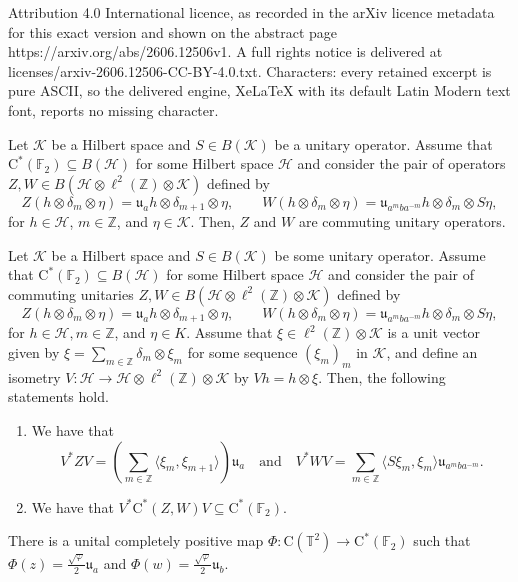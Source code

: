\documentclass[10pt,a4paper]{amsart}
\newcommand{\K}{{\mathcal{K}}}
\newcommand{\bF}{{\mathbb{F}}}
\newcommand{\bT}{{\mathbb{T}}}
\newcommand{\bZ}{{\mathbb{Z}}}
\newcommand{\rC}{\mathrm{C}}
\renewcommand{\H}{{\mathcal{H}}}
\renewcommand{\phi}{\varphi}
\begin{document}
Attribution 4.0 International licence, as recorded in the arXiv licence metadata for this exact version and shown on the abstract page https://arxiv.org/abs/2606.12506v1. A full rights notice is delivered at licenses/arxiv-2606.12506-CC-BY-4.0.txt. Characters: every retained excerpt is pure ASCII, so the delivered engine, XeLaTeX with its default Latin Modern text font, reports no missing character.
\begin{proposition}\label{p:cocyc-uni-comm-uni}
Let $\K$ be a Hilbert space and $S\in B(\K)$ be a unitary operator. Assume that $\rC^*(\bF_2)\subseteq B(\H)$ for some Hilbert space $\H$ and consider the pair of operators $Z,W\in B(\H\otimes \ell^2(\bZ)\otimes\K)$ defined by
    \[
        Z(h\otimes\delta_m\otimes\eta) = \mathfrak{u}_ah\otimes\delta_{m+1}\otimes\eta, \qquad W(h\otimes\delta_m\otimes\eta) = \mathfrak{u}_{a^m ba^{-m}}h\otimes\delta_m\otimes S\eta,
    \]
for $h\in\H$, $m\in\bZ$, and $\eta\in\K$. Then, $Z$ and $W$ are commuting unitary operators.
\end{proposition}

\begin{proposition}\label{p:univ-uni-compress}
    Let $\K$ be a Hilbert space and $S\in B(\K)$ be some unitary operator. Assume that $\rC^*(\bF_2)\subseteq B(\H)$ for some Hilbert space $\H$ and consider the pair of commuting unitaries $Z,W\in B(\H\otimes \ell^2(\bZ)\otimes\K)$ defined by
    \[
        Z(h\otimes\delta_m\otimes\eta) = \mathfrak{u}_ah\otimes\delta_{m+1}\otimes\eta, \qquad W(h\otimes\delta_m\otimes\eta) = \mathfrak{u}_{a^m ba^{-m}}h\otimes\delta_m\otimes S\eta,
    \]
    for $h\in\H, m\in\bZ$, and $\eta\in K$. Assume that $\xi\in\ell^2(\bZ)\otimes\K$ is a unit vector given by $\xi=\sum_{m\in\bZ}\delta_m\otimes\xi_m$ for some sequence $(\xi_m)_m$ in $\K$, and define an isometry $V:\H\rightarrow \H\otimes \ell^2(\bZ)\otimes\K$ by $Vh=h\otimes\xi$. Then, the following statements hold.
    \begin{enumerate}[{\rm (i)}]
        \item We have that
        \[
            V^*ZV = \left(\sum_{m\in\bZ}\langle \xi_m,\xi_{m+1}\rangle \right)\mathfrak{u}_a \quad \text{and} \quad V^*WV = \sum_{m\in\bZ} \langle S\xi_m,\xi_m\rangle\mathfrak{u}_{a^m b a^{-m}}.
        \]
        \item We have that $V^* \rC^*(Z,W) V \subseteq \rC^*(\bF_2)$.
    \end{enumerate}
\end{proposition}

\begin{theorem}\label{t:uni-comm-dil-constant}
    There is a unital completely positive map $\Phi:\rC(\bT^2)\rightarrow\rC^*(\bF_2)$ such that $\Phi(z) = \frac{\sqrt{\phi}}{2}\mathfrak{u}_a$ and $\Phi(w) = \frac{\sqrt{\phi}}{2}\mathfrak{u}_b$.
\end{theorem}
\end{document}
